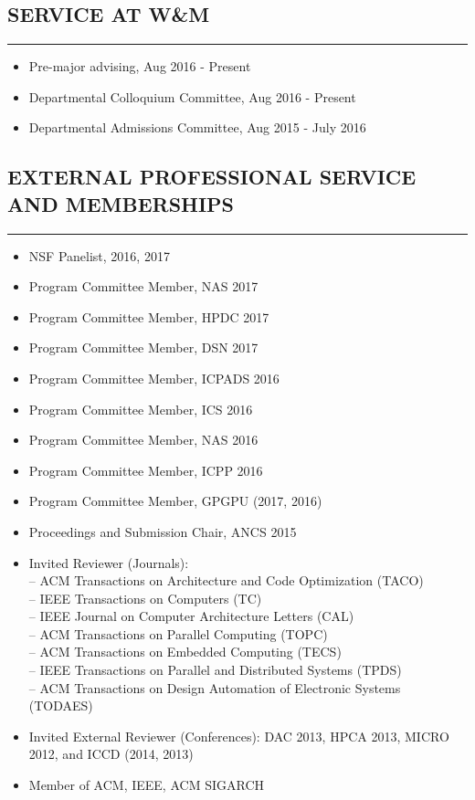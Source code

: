 \documentclass[10pt,a4]{article}
\begin{document}
\subsection*{SERVICE AT W\&M}
\hrule
\vspace{0.2cm}
\begin{itemize}
	\item Pre-major advising, Aug 2016 - Present
	\item Departmental Colloquium Committee, Aug 2016 - Present
	\item Departmental Admissions Committee, Aug 2015 - July 2016
\end{itemize}

\subsection*{EXTERNAL PROFESSIONAL SERVICE AND MEMBERSHIPS}
\hrule
\vspace{0.2cm}
\begin{itemize}
	\item NSF Panelist, 2016, 2017
	\item Program Committee Member, NAS 2017
	\item Program Committee Member, HPDC 2017
	\item Program Committee Member, DSN 2017
	\item Program Committee Member, ICPADS 2016 
	\item Program Committee Member, ICS 2016
	\item Program Committee Member, NAS 2016
	\item Program Committee Member, ICPP 2016
	\item Program Committee Member, GPGPU (2017, 2016)
	\item Proceedings and Submission Chair, ANCS 2015
	\item Invited Reviewer (Journals):  \\
	-- ACM Transactions on Architecture and Code Optimization (TACO) \\
	-- IEEE Transactions on Computers (TC) \\ 
	-- IEEE Journal on Computer Architecture Letters (CAL) \\
	-- ACM Transactions on Parallel Computing (TOPC) \\
	-- ACM Transactions on Embedded Computing (TECS) \\
	-- IEEE Transactions on Parallel and Distributed Systems (TPDS) \\
	-- ACM Transactions on Design Automation of Electronic Systems (TODAES) \\
	\item Invited External Reviewer (Conferences):
	DAC 2013, HPCA 2013, MICRO 2012, and ICCD (2014, 2013)
	\item Member of ACM, IEEE, ACM SIGARCH
\end{itemize}
\end{document}
